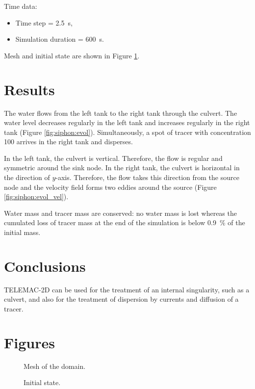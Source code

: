 Time data:

\begin{itemize}
\item Time step = 2.5~s,
\item Simulation duration = 600~s.
\end{itemize}

Mesh and initial state are shown in Figure \ref{fig:siphon:mesh}.

\section{Results}

The water flows from the left tank to the right tank through the culvert. The
water level decreases regularly in the left tank and increases regularly in the
right tank (Figure \ref{fig:siphon:evol}). Simultaneously, a spot of tracer with concentration
100 arrives in the right tank and disperses.

In the left tank, the culvert is vertical. Therefore, the flow is regular and
symmetric around the sink node. In the right tank, the culvert is horizontal in
the direction of $y$-axis. Therefore, the flow takes this direction from the
source node and the velocity field forms two eddies around the source (Figure
\ref{fig:siphon:evol_vel}).

Water mass and tracer mass are conserved: no water mass is lost whereas the
cumulated loss of tracer mass at the end of the simulation is below 0.9~\% of
the initial mass.

\section{Conclusions}

TELEMAC-2D can be used for the treatment of an internal singularity, such as a
culvert, and also for the treatment of dispersion by currents and diffusion of
a tracer.

\section{Figures}

\begin{figure}
\centering
{}
\caption{Mesh of the domain.}
\label{fig:siphon:mesh}
\end{figure}
\begin{figure}
\centering
{}
\caption{Initial state.}\label{fig:siphon:init}
\end{figure}


